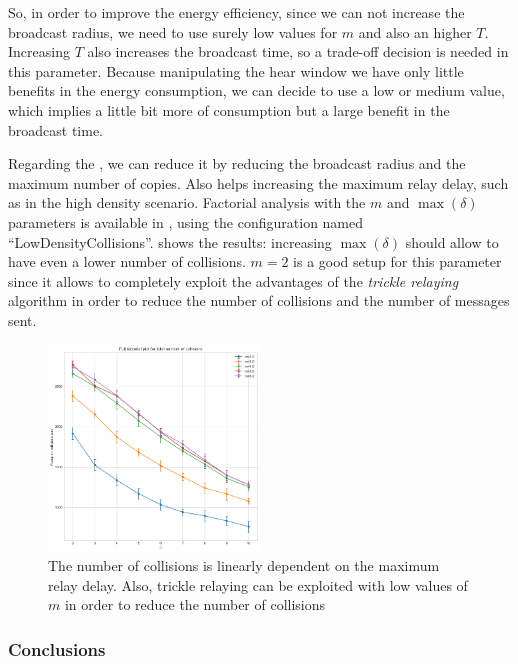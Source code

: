 So, in order to improve the energy efficiency, since we can not increase the
broadcast radius, we need to use surely low values for \(m\) and also an higher
\(T\). Increasing \(T\) also increases the broadcast time, so a trade-off
decision is needed in this parameter. Because manipulating the hear window we
have only little benefits in the energy consumption, we can decide to use a low
or medium value, which implies a little bit more of consumption but a large
benefit in the broadcast time.

Regarding the , we can reduce it by
reducing the broadcast radius and the maximum number of copies. Also helps
increasing the maximum relay delay, such as in the high density scenario.
Factorial analysis with the \(m\) and \(\max(\delta)\) parameters is available
in , using the configuration named
``LowDensityCollisions''.  shows the results:
increasing \(\max(\delta)\) should allow to have even a lower number of
collisions. \(m\!=\!2\) is a good setup for this parameter since it allows to
completely exploit the advantages of the \emph{trickle relaying} algorithm in
order to reduce the number of collisions and the number of messages sent.

\begin{figure}[htb]
	\centering
	\includegraphics[width=0.5\textwidth]{img/ld/collisions-D-ffplot}
	\caption{The number of collisions is linearly dependent on the maximum
	relay delay. Also, trickle relaying can be exploited with low values of
	\(m\) in order to reduce the number of
	collisions}\label{fig:ldcollisionsff}
\end{figure}

\subsubsection{Conclusions}\label{subsubsec:ldconclusions}


